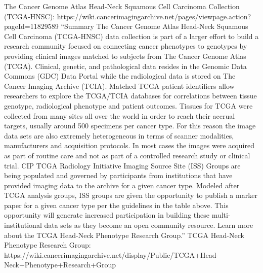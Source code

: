 \documentclass{article}%
\begin{document}
%
The Cancer Genome Atlas Head{-}Neck Squamous Cell Carcinoma Collection (TCGA{-}HNSC): https://wiki.cancerimagingarchive.net/pages/viewpage.action?pageId=11829589%
\newline%
\newline%
%
“Summary%
\newline%
\newline%
%
The Cancer Genome Atlas Head{-}Neck Squamous Cell Carcinoma (TCGA{-}HNSC) data collection is part of a larger effort to build a research community focused on connecting cancer phenotypes to genotypes by providing clinical images matched to subjects from The Cancer Genome Atlas (TCGA). Clinical, genetic, and pathological data resides in the Genomic Data Commons (GDC) Data Portal while the radiological data is stored on The Cancer Imaging Archive (TCIA). %
\newline%
\newline%
%
Matched TCGA patient identifiers allow researchers to explore the TCGA/TCIA databases for correlations between tissue genotype, radiological phenotype and patient outcomes.  Tissues for TCGA were collected from many sites all over the world in order to reach their accrual targets, usually around 500 specimens per cancer type.  For this reason the image data sets are also extremely heterogeneous in terms of scanner modalities, manufacturers and acquisition protocols.  In most cases the images were acquired as part of routine care and not as part of a controlled research study or clinical trial. %
\newline%
\newline%
%
%
\newline%
\newline%
%
CIP TCGA Radiology Initiative%
\newline%
\newline%
%
Imaging Source Site (ISS) Groups are being populated and governed by participants from institutions that have provided imaging data to the archive for a given cancer type. Modeled after TCGA analysis groups, ISS groups are given the opportunity to publish a marker paper for a given cancer type per the guidelines in the table above. This opportunity will generate increased participation in building these multi{-}institutional data sets as they become an open community resource.  Learn more about the TCGA Head{-}Neck Phenotype Research Group.”%
\newline%
\newline%
%
TCGA Head{-}Neck Phenotype Research Group: https://wiki.cancerimagingarchive.net/display/Public/TCGA+Head{-}Neck+Phenotype+Research+Group %
\end{document}
